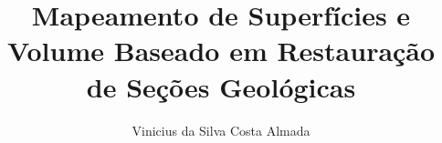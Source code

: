 \documentclass[
  master
  brazilian
]{ThesisPUC}
\author{Vinicius da Silva Costa Almada}
\title{Mapeamento de Superfícies e Volume Baseado em Restauração de Seções Geológicas}
\begin{document}
  
  
  
  
  
  
  \arial
  
  \normalfont
\end{document}
